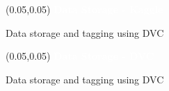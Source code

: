 \documentclass[aspectratio=169]{beamer} %
\begin{document}
\begin{frame}{}
    \setlength{\TPHorizModule}{\textwidth}
    \setlength{\TPVertModule}{\textwidth}
    \begin{textblock}{0.74}(0.05,0.05)
        \bfseries\large\textcolor{white}{Data Storage - Kaggle}
    \end{textblock}

    Data storage and tagging using DVC

\end{frame}

\begin{frame}{}
    \setlength{\TPHorizModule}{\textwidth}
    \setlength{\TPVertModule}{\textwidth}
    \begin{textblock}{0.74}(0.05,0.05)
        \bfseries\large\textcolor{white}{Data Storage - DVC}
    \end{textblock}

Data storage and tagging using DVC

\end{frame}
\end{document}
